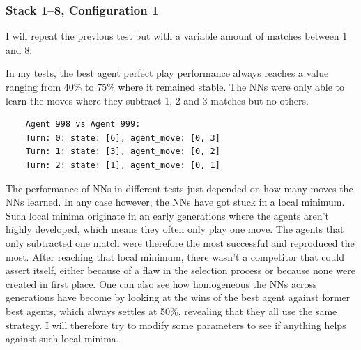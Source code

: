 \documentclass[11pt]{report}
\begin{document}
\begin{enumerate}
    \subsubsection{Stack 1--8, Configuration 1}
    I will repeat the previous test but with a variable amount of matches between 1 and 8:
    \renewcommand{\csvpath}{../data/simple_nim/stack_8r/t_1.2/stats.csv} %
    \begin{center}
    \end{center}
    In my tests, the best agent perfect play performance always reaches a value ranging from 40\% to 75\% where it remained stable.
    The NNs were only able to learn the moves where they subtract 1, 2 and 3 matches but no others.
    \begin{verbatim}
    Agent 998 vs Agent 999:
    Turn: 0: state: [6], agent_move: [0, 3]
    Turn: 1: state: [3], agent_move: [0, 2]
    Turn: 2: state: [1], agent_move: [0, 1]
    \end{verbatim}
    The performance of NNs in different tests just depended on how many moves the NNs learned.
    In any case however, the NNs have got stuck in a local minimum.
    Such local minima originate in an early generations where the agents aren't highly developed, which means they often only play one move.
    The agents that only subtracted one match were therefore the most successful and reproduced the most.
    After reaching that local minimum, there wasn't a competitor that could assert itself, either because of a flaw in the selection process or because none were created in first place.
    One can also see how homogeneous the NNs across generations have become by looking at the wins of the best agent against former best agents, which always settles at 50\%, revealing that they all use the same strategy.
    I will therefore try to modify some parameters to see if anything helps against such local minima.


\end{enumerate}
\end{document}
